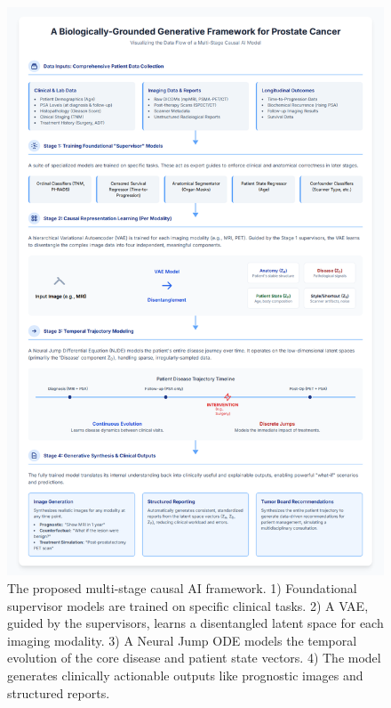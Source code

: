 \documentclass[11pt, a4paper]{article}
\begin{document}
\begin{figure}[H]
    \centering
    \includegraphics[width=\textwidth]{ml.png}
    \caption{The proposed multi-stage causal AI framework. 1) Foundational supervisor models are trained on specific clinical tasks. 2) A VAE, guided by the supervisors, learns a disentangled latent space for each imaging modality. 3) A Neural Jump ODE models the temporal evolution of the core disease and patient state vectors. 4) The model generates clinically actionable outputs like prognostic images and structured reports.}
    \label{fig:ml_framework}
\end{figure}
\end{document}
